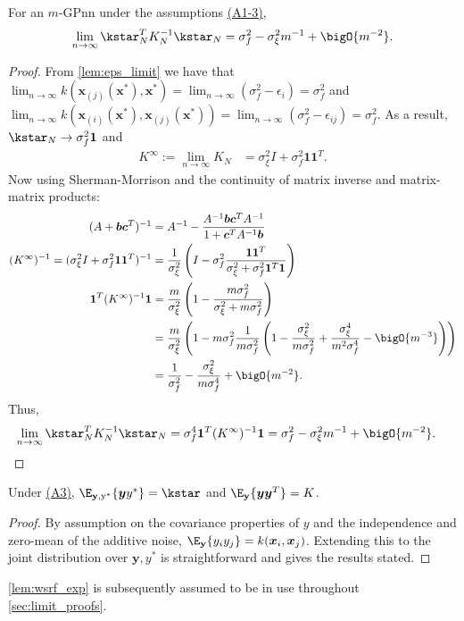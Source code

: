 \begin{lemma}
    \label{lem:nngp_limit}
    For an \(m\)-GPnn under the assumptions \hyperref[{desc:assumptions_nngp}]{(A1-3)},
    \[\lim_{n\rightarrow\infty} \kstar_N^TK_N^{-1}\kstar_N = \sigma_f^2-\sigma_\xi^2m^{-1} + \bigO{m^{-2}}.\]
\end{lemma}
\begin{proof}
    From \autoref{lem:eps_limit} we have that 
    \(\lim_{n\rightarrow\infty}k(\mathbf{x}_{(j)}(\bm{x}^*),\bm{x}^*) =
    \lim_{n\rightarrow\infty} (\sigma_f^2 - \epsilon_i) = \sigma_f^2\) and \(\lim_{n\rightarrow\infty} k(\mathbf{x}_{(i)}(\bm{x}^*), \mathbf{x}_{(j)}(\bm{x}^*)) = \lim_{n\rightarrow\infty}(\sigma_f^2 - \epsilon_{ij}) = \sigma_f^2\). 
    As a result, \(\kstar_N\rightarrow \sigma_f^2 \bm{1}\) and 
\begin{align}
    K^\infty:= \lim_{n\rightarrow\infty}K_N & = \sigma_\xi^2 I + \sigma_f^2\bm{11}^T.
\end{align}
Now using Sherman-Morrison and the continuity of matrix inverse and matrix-matrix products:
\begin{align}
    (A + \bm{bc}^T)^{-1} &= A^{-1} - \frac{A^{-1}\bm{bc}^TA^{-1}}{1+\bm{c}^TA^{-1}\bm{b}} \label{eq:sherman-morrison}\\
    (K^\infty)^{-1} = (\sigma_\xi^2I + \sigma_f^2 \bm{11}^T)^{-1} &= \frac{1}{\sigma_\xi^2}\left(I -
    \sigma_f^2\frac{\bm{11}^T}{\sigma_\xi^2 + \sigma_f^2\bm{1}^T\bm{1}}\right) \label{eq:lim_Kinv}\\
    \bm{1}^T(K^\infty)^{-1}\bm{1} &= \frac{m}{\sigma_\xi^2}\left(1 -
    \frac{m\sigma_f^2}{\sigma_\xi^2 + m\sigma_f^2}\right) \nonumber\\
    &= \frac{m}{\sigma_\xi^2}\left(1-m\sigma_f^2\frac{1}{m\sigma_f^2}\left(1-\frac{\sigma_\xi^2}{m\sigma_f^2}
    +\frac{\sigma_\xi^4}{m^2\sigma_f^4}-\bigO{m^{-3}}\right)\right) \nonumber\\
    &= \frac{1}{\sigma_f^2} -\frac{\sigma_\xi^2}{m\sigma_f^4} + \bigO{m^{-2}} \label{eq:Kinf_sum}. 
\end{align}
Thus,
\begin{align}
    \lim_{n\rightarrow\infty}\kstar_N^TK_N^{-1}\kstar_N &=
    \sigma_f^4\bm{1}^T(K^\infty)^{-1}\bm{1} = \sigma_f^2-\sigma_\xi^2m^{-1} + \bigO{m^{-2}}.
\end{align}
\end{proof}

\begin{lemma}\label{lem:wsrf_exp}
    Under \hyperref[ass:nngp_y]{(A3)}, \(\E_{\mathbf{y},\mathrm{y^*}}\{\bm{y}y^*\} = \kstar\) and \(\E_{\mathbf{y}}\{\bm{yy}^T\} = K\).
\end{lemma}
\begin{proof}
    By assumption on the covariance properties of \(y\) and the independence and zero-mean of the additive noise, \(\E_\mathbf{y}\{y_iy_j\}=k(\bm{x}_i,\bm{x}_j)\). Extending this to the joint distribution over \(\bm{y},y^*\) is straightforward and gives the results stated.
\end{proof}
\autoref{lem:wsrf_exp} is subsequently assumed to be in use throughout \ref{sec:limit_proofs}.

